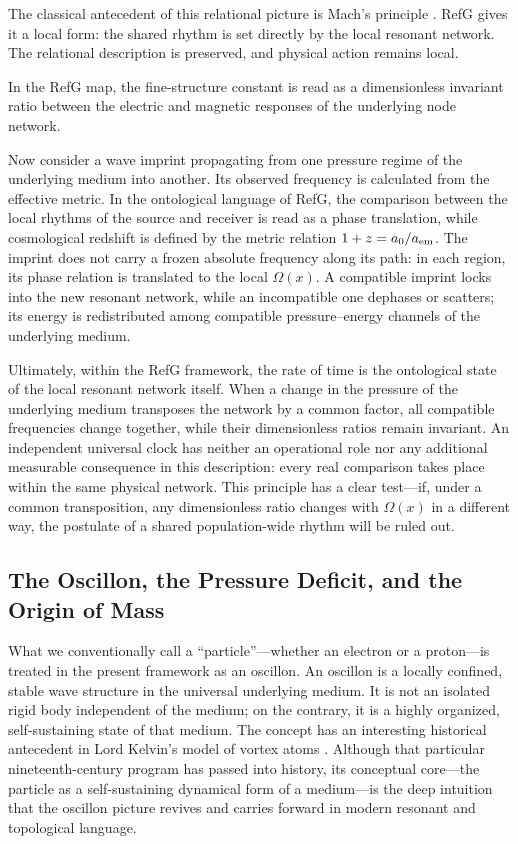 \documentclass[11pt,a4paper]{article}
\begin{document}
The classical antecedent of this relational picture is Mach's principle \citep{mach1883}. RefG gives it a local form: the shared rhythm is set directly by the local resonant network. The relational description is preserved, and physical action remains local.

In the RefG map, the fine-structure constant is read as a dimensionless invariant ratio between the electric and magnetic responses of the underlying node network.

Now consider a wave imprint propagating from one pressure regime of the underlying medium into another. Its observed frequency is calculated from the effective metric. In the ontological language of RefG, the comparison between the local rhythms of the source and receiver is read as a phase translation, while cosmological redshift is defined by the metric relation $1+z=a_0/a_{\rm em}$. The imprint does not carry a frozen absolute frequency along its path: in each region, its phase relation is translated to the local $\Omega(x)$. A compatible imprint locks into the new resonant network, while an incompatible one dephases or scatters; its energy is redistributed among compatible pressure--energy channels of the underlying medium.

Ultimately, within the RefG framework, the rate of time is the ontological state of the local resonant network itself. When a change in the pressure of the underlying medium transposes the network by a common factor, all compatible frequencies change together, while their dimensionless ratios remain invariant. An independent universal clock has neither an operational role nor any additional measurable consequence in this description: every real comparison takes place within the same physical network. This principle has a clear test---if, under a common transposition, any dimensionless ratio changes with $\Omega(x)$ in a different way, the postulate of a shared population-wide rhythm will be ruled out.

\subsection{The Oscillon, the Pressure Deficit, and the Origin of Mass}

What we conventionally call a ``particle''---whether an electron or a proton---is treated in the present framework as an oscillon. An oscillon is a locally confined, stable wave structure in the universal underlying medium. It is not an isolated rigid body independent of the medium; on the contrary, it is a highly organized, self-sustaining state of that medium. The concept has an interesting historical antecedent in Lord Kelvin's model of vortex atoms \citep{thomson1867}. Although that particular nineteenth-century program has passed into history, its conceptual core---the particle as a self-sustaining dynamical form of a medium---is the deep intuition that the oscillon picture revives and carries forward in modern resonant and topological language.
\end{document}
